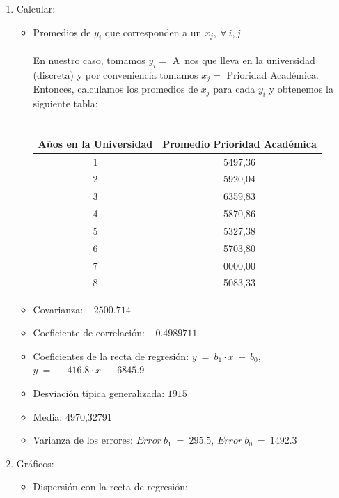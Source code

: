 	\begin{enumerate}
		\item Calcular:
			\begin{itemize}
			\item Promedios de $y_{i}$ que corresponden a un $x_{j},\ \forall\ i,j$ \\ \\
			En nuestro caso, tomamos $y_i = $ A~nos que lleva en la universidad (discreta) y por conveniencia tomamos $x_j = $ Prioridad Acad\'emica.\\
			Entonces, calculamos los promedios de $x_j$ para cada $y_i$ y obtenemos la siguiente tabla:\\ \\
			\begin{tabular}{c|c}
			\hline
			A\~nos en la Universidad & Promedio Prioridad Acad\'emica \\
			\hline
			1 & 5497,36 \\
			\hline
			2 & 5920,04 \\
			\hline
			3 & 6359,83 \\
			\hline
			4 & 5870,86 \\
			\hline
			5 & 5327,38 \\
			\hline
			6 & 5703,80 \\
			\hline
			7 & 0000,00 \\
			\hline
			8 & 5083,33 \\
			\hline
			\end{tabular}
			\item Covarianza: $ -2500.714 $
			\item Coeficiente de correlaci\'on: $ -0.4989711 $
			\item Coeficientes de la recta de regresi\'on: $y\ =\ b_{1} \cdotp x\ +\ b_{0}$, $y\ =\ -416.8 \cdotp x\ +\ 6845.9 $
			\item Desviaci\'on t\'ipica generalizada: $1915$
			\item Media: 4970,32791
			\item Varianza de los errores: $Error\ b_{1}\ =\ 295.5$, $Error\ b_{0}\ =\ 1492.3 $
			\end{itemize}
		\item Gr\'aficos:
			\begin{itemize}
			\item Dispersi\'on con la recta de regresi\'on:
			\begin{center}

\end{center}
\end{itemize}
\end{enumerate}
